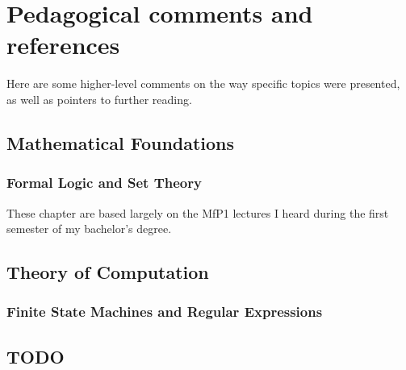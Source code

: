 \chapter{Pedagogical comments and references}\label{ch:refs}
Here are some higher-level comments on the way specific topics were presented,
as well as pointers to further reading.

\section{Mathematical Foundations}
\subsection{Formal Logic and Set Theory}

These chapter are based largely on the MfP1\cite{ref:mfp1} lectures I heard
during the first semester of my bachelor's degree.

\section{Theory of Computation}
\subsection{Finite State Machines and Regular Expressions}

\section{TODO}
